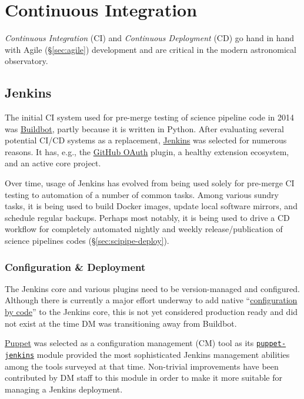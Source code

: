 \section{Continuous Integration}

\emph{Continuous Integration} (CI) and \emph{Continuous Deployment} (CD) go hand in hand with Agile (\S\ref{sec:agile}) development  and  are  critical in the  modern astronomical observatory.\cite{2014arXiv1407.6463E}

\subsection{Jenkins}
\label{sec:jenkins}

 The initial CI system used for pre-merge testing of science pipeline code in 2014  was \href{https://buildbot.net/}{Buildbot}, partly because it is written in Python.
After evaluating several potential CI/CD systems as a replacement,
\href{https://jenkins.io/}{Jenkins} was selected for numerous reasons.
It has, e.g.,  the \href{https://plugins.jenkins.io/github-oauth}{GitHub OAuth} plugin,
a healthy extension ecosystem, and an active core project.

Over time, usage of Jenkins has evolved from being used solely for pre-merge
CI testing to automation of a number of common tasks.  Among various sundry
tasks, it is being used to build Docker images, update local software mirrors, and
schedule regular backups.  Perhaps most notably, it is being used to drive a
CD workflow for completely automated nightly and weekly
release/publication of science pipelines codes (\S\ref{sec:scipipe-deploy}).

\subsubsection{Configuration \& Deployment}

The Jenkins core and various plugins need to be version-managed and configured.
Although there is currently a major effort underway to add native
``\href{https://github.com/jenkinsci/configuration-as-code-plugin}{configuration by code}'' to
the Jenkins core, this is not yet considered production ready and did not exist
at the time DM was transitioning away from Buildbot.

\href{https://puppet.com/}{Puppet} was selected as a configuration management (CM) tool as its \href{https://github.com/voxpupuli/puppet-jenkins}{\texttt{puppet-jenkins}} module provided the most sophisticated Jenkins management abilities among the tools surveyed at that time.
Non-trivial improvements have been contributed by DM staff to this module\cite{puppetconf-jenkins} in order to make it more suitable for managing a Jenkins deployment.

